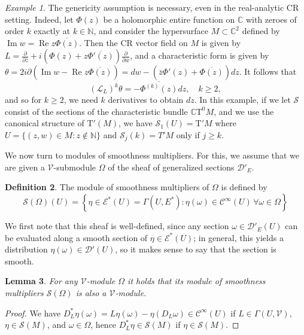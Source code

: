 \documentclass[11pt]{amsart}
\newcommand{\crb}{\mathcal{V}}
\newcommand{\C}{\mathbb{C}}
\newcommand{\N}{\mathbb{N}}
\newcommand{\dop}[1]{\frac{\partial}{\partial #1}}
\newcommand{\cinfty}{\mathcal{C}^\infty}
\newcommand{\ssheaf}{\mathcal{S}}
\newcommand{\holforms}{\mathrm{T}'}
\newcommand{\charforms}{\mathrm{T}^0}
\DeclareMathOperator{\imag}{Im}
\DeclareMathOperator{\real}{Re}
\theoremstyle{definition}
\newtheorem{defn}{Definition}[section]
\theoremstyle{remark}
\newtheorem{exa}[defn]{Example}
\theoremstyle{plain}
\newtheorem{lem}[defn]{Lemma}
\begin{document}
\begin{exa}
  The genericity assumption is necessary, even in the real-analytic CR setting. Indeed, let $\Phi(z)$ be a holomorphic entire
  function on $\C$ with zeroes of order $k$ exactly at $k \in \N$, and consider the hypersurface $M \subset \C^2$ defined by  $\imag w= \real z \overline{\Phi(z)}$.
  Then the CR vector field on $M$ is given by $L = \dop{\bar z} + i (\Phi(z) + z \overline{\Phi'(z)}) \dop {\bar w}$, and
  a characteristic form is given by $\theta = 2i \partial (\imag w - \real z \overline{\Phi (z)}) = dw - (\bar z \Phi'(z) + \overline{\Phi(z)}) dz $. It follows that
  \[ (\mathcal{L}_L)^k \theta = - \overline{\Phi^{(k)} (z)} dz, \quad k\geq 2,  \]
  and so for $k\geq 2$, we need $k$ derivatives to obtain $dz$. In this example, if we let $\ssheaf$ consist of the sections of the
  characteristic bundle $\C \charforms{M}$, and we use the canonical structure of $\holforms(M)$, we have $\ssheaf_1 (U) = \holforms M$ where
  $U = \{ (z,w) \in M \colon z \notin \N \}$ and $\ssheaf_j (k) = T'M$ only if $j\geq k$. 
\end{exa}


We now turn to modules of smoothness multipliers. For this, we assume that we are given a $\crb$-submodule
$\Omega$  of the sheaf of generalized sections $\mathcal{D}'_E $.

\begin{defn}
  The module of smoothness multipliers of $ \Omega$ is defined by
  \[ \mathcal{S}(\Omega) (U) = 
    \left\{
      \eta \in \mathcal{E}^* (U) = \Gamma (U, E^*) \colon  \eta (\omega) \in \cinfty(U) \, \forall
      \omega \in \Omega
    \right\} \]
\end{defn}

We first note that this sheaf is well-defined,
since any section  $\omega \in \mathcal{D}'_E(U)$ can be evaluated along a
smooth section of $\eta \in  \mathcal{E}^*(U)$; in general, this yields a distribution $\eta(\omega)\in\mathcal{D}'(U)$, so it
makes sense to say that the section is smooth.

\begin{lem}\label{lem:smoothnessV}
  For any $\crb$-module $\Omega$ it holds that  its module of
  smoothness multipliers $\mathcal{S}(\Omega)$ is also a $\crb$-module. 
\end{lem}

\begin{proof}
  We have $D_L^* \eta (\omega) = L \eta(\omega) - \eta(D_L \omega) \in \cinfty(U)$
  if $L \in \Gamma (U,\crb)$, $\eta \in \mathcal{S}(M)$, and $\omega \in \Omega $, hence $D_L^* \eta \in\mathcal{S}(M) $ if $\eta\in \mathcal{S}(M)$. 
\end{proof}
\end{document}
